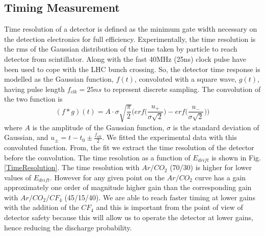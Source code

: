 \subsection{Timing Measurement}
Time resolution of a detector is defined as the minimum gate width necessary on the detection electronics for full efficiency. Experimentally, the time resolution is the rms of the Gaussian distribution of the time taken by particle to reach detector from scintillator. Along with the fast 40MHz (25ns) clock pulse have been used to cope with the LHC bunch crossing. So, the detector time response is modelled as the Gaussian function, $f(t)$, convoluted with a square wave, $g(t)$, having pulse length $f_{clk}=25ns$ to represent discrete sampling. 
The convolution of the two function is
\begin{equation}
(f*g)(t) = A \cdot \sigma \sqrt{\frac{\pi}{2}}\Big(erf\Big(\frac{u_{+}}{\sigma\sqrt{2}}\Big)-erf\Big(\frac{u_{-}}{\sigma\sqrt{2}}\Big)\Big)
\end{equation}
where $A$ is the amplitude of the Gaussian function, $\sigma$ is the standard deviation of Gaussian, and $u_{\pm}= t-t_0\pm\frac{f_{clk}}{2}$. 
We fitted the experimental data with this convoluted function. From, the fit we extract the time resolution of the detector before the convolution. The time resolution as a function of $E_{drift}$ is shown in Fig. \ref{TimeResolution}. The time resolution with $Ar/CO_2$ (70/30) is higher for lower values of $E_{drift}$. However for any given point on the $Ar/CO_2$ curve has a gain approximately one order of magnitude higher gain than the corresponding gain with $Ar/CO_2/CF_4$ (45/15/40).  We are able to reach faster timing at lower gains with the addition of the $CF_4$ and this is important from the point of view of detector safety because this will allow us to operate the detector at lower gains, hence reducing the discharge probability.

